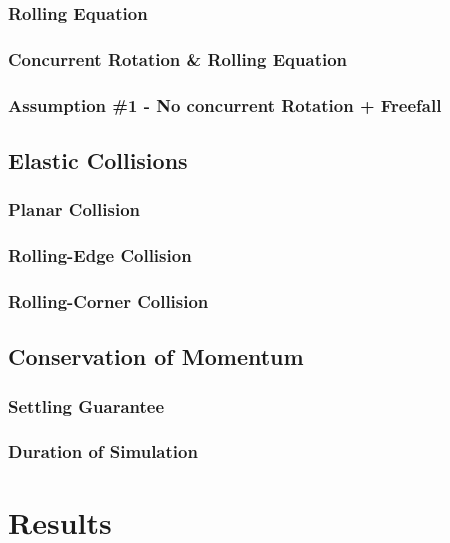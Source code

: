 		\subsubsection{Rolling Equation}

		\subsubsection{Concurrent Rotation \& Rolling Equation}

		\subsubsection{Assumption \#1 - No concurrent Rotation + Freefall}

	\subsection{Elastic Collisions}

		\subsubsection{Planar Collision}

		\subsubsection{Rolling-Edge Collision}

		\subsubsection{Rolling-Corner Collision}

	\subsection{Conservation of Momentum}

		\subsubsection{Settling Guarantee}

		\subsubsection{Duration of Simulation}



\section{Results}

